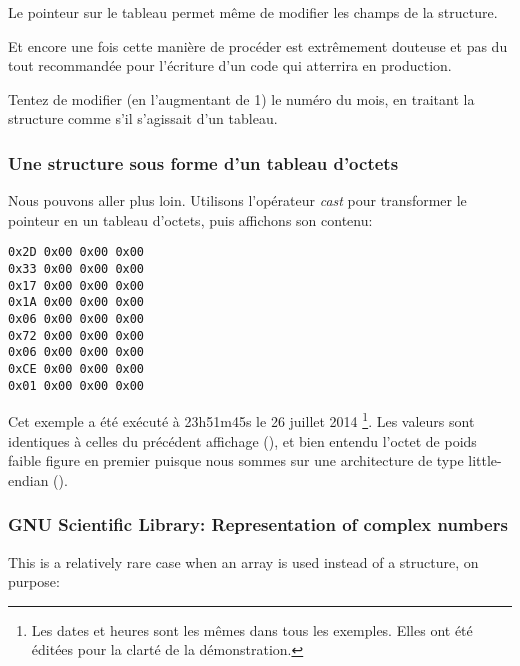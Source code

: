 Le pointeur sur le tableau permet même de modifier les champs de la structure.

Et encore une fois cette manière de procéder est extrêmement douteuse et pas du tout recommandée 
pour l'écriture d'un code qui atterrira en production.

\mysubparagraph{\Exercise}

Tentez de modifier (en l'augmentant de 1) le numéro du mois, en traitant la structure comme s'il 
s'agissait d'un tableau.

\subsubsection{Une structure sous forme d'un tableau d'octets}

Nous pouvons aller plus loin.
Utilisons l'opérateur \emph{cast} pour transformer le pointeur en un tableau d'octets, puis affichons 
son contenu:



\begin{lstlisting}
0x2D 0x00 0x00 0x00 
0x33 0x00 0x00 0x00 
0x17 0x00 0x00 0x00 
0x1A 0x00 0x00 0x00 
0x06 0x00 0x00 0x00 
0x72 0x00 0x00 0x00 
0x06 0x00 0x00 0x00 
0xCE 0x00 0x00 0x00 
0x01 0x00 0x00 0x00 
\end{lstlisting}

Cet exemple a été exécuté à 23h51m45s le 26 juillet 2014
\footnote{Les dates et heures sont les mêmes dans tous les exemples. Elles ont été éditées 
pour la clarté de la démonstration.}.
Les valeurs sont identiques à celles du précédent affichage (), et bien 
entendu l'octet de poids faible figure en premier puisque nous sommes sur une architecture de type 
little-endian ().



\iffalse
\subsubsection{GNU Scientific Library: Representation of complex numbers}

This is a relatively rare case when an array is used instead of a structure, on purpose:

